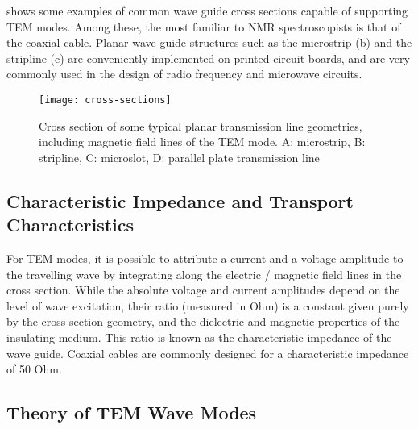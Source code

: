 shows some examples of common wave guide cross sections capable of supporting
TEM modes. Among these,
the most familiar to NMR spectroscopists is that of the coaxial cable.
Planar wave guide structures such as the microstrip (b) and the
stripline (c) are conveniently implemented on printed circuit
boards, \cite{Barret:1955ie} and are very commonly used in the design of
radio frequency and microwave circuits.

\begin{figure}
	\begin{center}
		\texttt{[image: cross-sections]}
	\end{center}
	\caption{Cross section of some typical planar transmission line geometries,
  		including magnetic field lines of the TEM mode. A: microstrip, B: stripline, C: microslot, D: parallel plate transmission line}
	\label{fig:cross-sections}
\end{figure}

\subsection{Characteristic Impedance and Transport
Characteristics}\label{characteristic-impedance-and-transport-characteristics}

For TEM modes, it is possible to attribute a current and a voltage
amplitude to the travelling wave by integrating along the electric /
magnetic field lines in the cross section. While the absolute voltage
and current amplitudes depend on the level of wave excitation, their
ratio (measured in Ohm) is a constant given purely by the cross section
geometry, and the dielectric and magnetic properties of the insulating
medium. This ratio is known as the characteristic impedance  of
the wave guide. Coaxial cables are commonly designed for a
characteristic impedance of 50 Ohm.

\subsection{Theory of TEM Wave Modes}\label{theory-of-tem-wave-modes}

